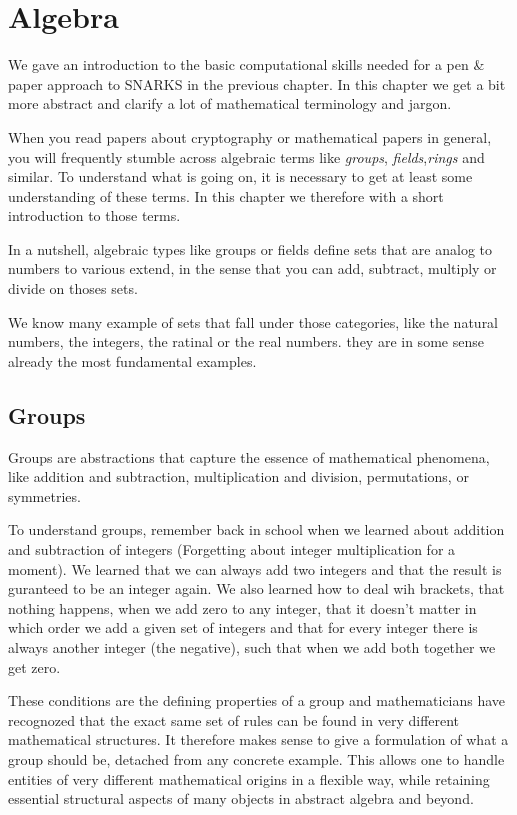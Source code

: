 \chapter{Algebra}
We gave an introduction to the basic computational skills needed for a pen \& paper approach to SNARKS in the previous chapter. In this chapter we get a bit more abstract and clarify a lot of mathematical terminology and jargon.

When you read papers about cryptography or mathematical papers in general, you will frequently stumble across algebraic terms like \textit{groups}, \textit{fields},\textit{rings} and similar. To understand what is going on, it is necessary to get at least some understanding of these terms. In this chapter we therefore with a short introduction to those terms.

In a nutshell, algebraic types like groups or fields define sets that are analog to numbers to various extend, in the sense that you can add, subtract, multiply or divide on thoses sets. 

We know many example of sets that fall under those categories, like the natural numbers, the integers, the ratinal or the real numbers. they are in some sense already the most fundamental examples.

\section{Groups} Groups are abstractions that capture the essence of mathematical phenomena, like addition and subtraction, multiplication and division, permutations, or symmetries.

To understand groups, remember back in school when we learned about addition and subtraction of integers (Forgetting about integer multiplication for a moment). We learned that we can always add two integers and that the result is guranteed to be an integer again. We also learned how to deal wih brackets, that nothing happens, when we add zero to any integer, that it doesn't matter in which order we add a given set of integers and that for every integer there is always another integer (the negative), such that when we add both together we get zero. 

These conditions are the defining properties of a group and mathematicians have recognozed that the exact same set of rules can be found in very different mathematical structures. It therefore makes sense to give a formulation of what a group should be, detached from any concrete example. This allows one to handle entities of very different mathematical origins in a flexible way, while retaining essential structural aspects of many objects in abstract algebra and beyond. 

